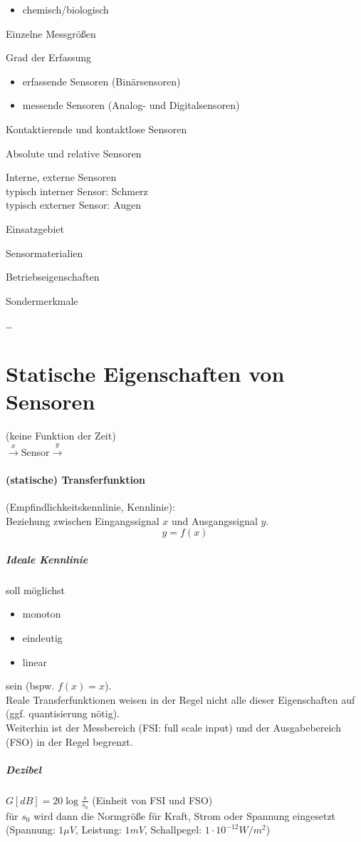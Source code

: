 \begin{anumerate}
\begin{itemize}
\item chemisch/biologisch
\end{itemize}
\item Einzelne Messgrößen
\item Grad der Erfassung
\begin{itemize}
\item erfassende Sensoren (Binärsensoren)
\item messende Sensoren (Analog- und Digitalsensoren)
\end{itemize}
\item Kontaktierende und kontaktlose Sensoren
\item Absolute und relative Sensoren
\item Interne, externe Sensoren\\
typisch interner Sensor: Schmerz\\
typisch externer Sensor: Augen
\item Einsatzgebiet
\item Sensormaterialien
\item Betriebseigenschaften
\item Sondermerkmale
\item[] …
\end{anumerate}

\section{Statische Eigenschaften von Sensoren}
(keine Funktion der Zeit)\\
$\overset{x}{\longrightarrow}$Sensor$\overset{y}{\longrightarrow}$
\paragraph{(statische) Transferfunktion} (Empfindlichkeitskennlinie, Kennlinie):\\
Beziehung zwischen Eingangssignal $x$ und Ausgangssignal $y$.
$$\boxed{y=f(x)}$$
\subparagraph{Ideale Kennlinie} soll möglichst
\begin{itemize}
\item monoton
\item eindeutig
\item linear
\end{itemize}
sein (bspw. $f(x)=x$).\\
Reale Transferfunktionen weisen in der Regel nicht alle dieser Eigenschaften auf (ggf. quantisierung nötig).\\
Weiterhin ist der Messbereich (FSI: full scale input) und der Ausgabebereich (FSO) in der Regel begrenzt.
\subparagraph{Dezibel} $G[dB]=20 \log \frac{s}{s_0}$ (Einheit von FSI und FSO)\\
für $s_0$ wird dann die Normgröße für Kraft, Strom oder Spannung eingesetzt (Spannung: $1 \mu V$, Leistung: $1mV$, Schallpegel: $1\cdot 10^{-12}W/m^2$)

